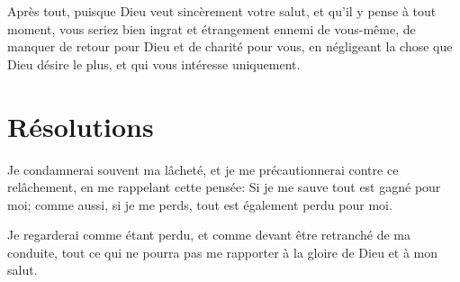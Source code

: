 \documentclass[instructions.tex]{subfiles}
\begin{document}
Après tout, puisque Dieu veut sincèrement votre salut, et qu'il y pense à tout moment, vous seriez bien ingrat et étrangement ennemi de vous-même, de manquer de retour pour Dieu et de charité pour vous, en négligeant la chose que Dieu désire le plus, et qui vous intéresse uniquement.


\section{Résolutions}

\primo Je condamnerai souvent ma lâcheté, et je me précautionnerai contre ce relâchement, en me rappelant cette pensée: Si je me sauve tout est gagné pour moi; comme aussi, si je me perds, tout est également perdu pour moi. 

\secundo Je regarderai comme étant perdu, et comme devant être retranché de ma conduite, tout ce qui ne pourra pas me rapporter à la gloire de Dieu et à mon salut. 

\end{document}

